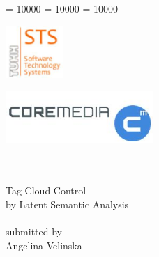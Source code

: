 \documentclass[12pt,a4paper]{extreport}
\begin{document}
\clubpenalty = 10000
\widowpenalty = 10000 
\displaywidowpenalty = 10000

\newenvironment{summary}{\begin{quotation}\it\textbf{Summary.\space}}{\end{quotation}\vspace{0.3cm}}
\begin{titlepage}
\begin{minipage}{1\linewidth}
\begin{flushright}
\begin{minipage}[h]{0.4\linewidth}
\includegraphics[height=2cm]{img/STSlogo}
\end{minipage}
\hspace{0.5cm}
\begin{minipage}[h]{0.4\linewidth}
\includegraphics[height=2cm]{img/CoremediaLogo}
\end{minipage}\\
\bigskip
\Huge
\hrulefill\\
\bigskip
Tag Cloud Control \\by Latent Semantic Analysis\\
\hrulefill\\ \bigskip \bigskip
\normalsize submitted by\\
\large
Angelina Velinska\\
\vspace{0.5cm}
\end{flushright}
\end{minipage}

\vspace{5.5cm}

\begin{minipage}[b]{1\linewidth}
\begin{flushright}
\bigskip


\end{flushright}
\end{minipage}


\end{titlepage}
\end{document}
